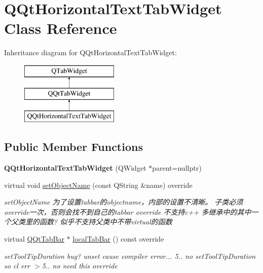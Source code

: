 \hypertarget{class_q_qt_horizontal_text_tab_widget}{}\section{Q\+Qt\+Horizontal\+Text\+Tab\+Widget Class Reference}
\label{class_q_qt_horizontal_text_tab_widget}
Inheritance diagram for Q\+Qt\+Horizontal\+Text\+Tab\+Widget\+:\begin{figure}[H]
\begin{center}
\leavevmode
\includegraphics[height=3.000000cm]{class_q_qt_horizontal_text_tab_widget}
\end{center}
\end{figure}
\subsection*{Public Member Functions}
\begin{DoxyCompactItemize}
\item 
\mbox{\label{class_q_qt_horizontal_text_tab_widget_ae0bcf968af3922fa19fd1836661a14eb}} 
{\bfseries Q\+Qt\+Horizontal\+Text\+Tab\+Widget} (Q\+Widget $\ast$parent=nullptr)
\item 
virtual void \mbox{\hyperlink{class_q_qt_horizontal_text_tab_widget_a788d91acd924a0eceafcb0fa95c91ffe}{set\+Object\+Name}} (const Q\+String \&name) override
\begin{DoxyCompactList}\small\item\em set\+Object\+Name 为了设置tabbar的objectname，内部的设置不清晰。 子类必须override一次，否则会找不到自己的tabbar override 不支持c++ 多继承中的其中一个父类里的函数? 似乎不支持父类中不带virtual的函数 \end{DoxyCompactList}\item 
virtual \mbox{\hyperlink{class_q_qt_tab_bar}{Q\+Qt\+Tab\+Bar}} $\ast$ \mbox{\hyperlink{class_q_qt_horizontal_text_tab_widget_a212f673045037d360d73d534ebf7ced1}{local\+Tab\+Bar}} () const override
\begin{DoxyCompactList}\small\item\em set\+Tool\+Tip\+Duration bug? unset cause compiler error... 5.. no set\+Tool\+Tip\+Duration so cl err $>$5.. no need this override \end{DoxyCompactList}\end{DoxyCompactItemize}


